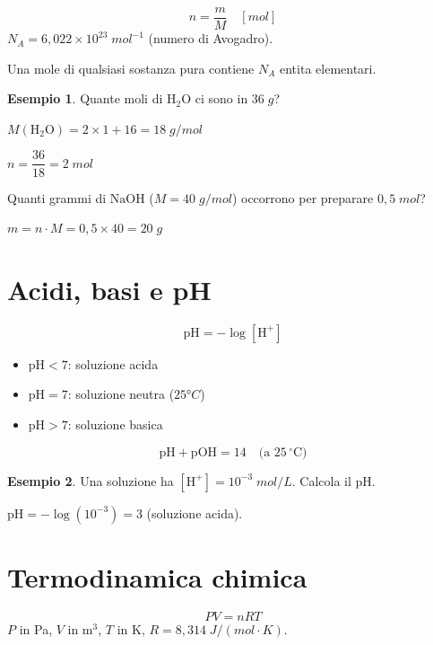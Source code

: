 \documentclass[12pt, a4paper, twoside, openright]{book}
\theoremstyle{definition}
\newtheorem{esempio}{Esempio}[section]
\begin{document}
\begin{defbox}
\[
n = \frac{m}{M} \quad [\si{mol}]
\]
$N_A = 6{,}022 \times 10^{23}\;\si{mol^{-1}}$ (numero di Avogadro).

Una mole di qualsiasi sostanza pura contiene $N_A$ entita elementari.
\end{defbox}

\begin{esempio}
Quante moli di $\mathrm{H_2O}$ ci sono in $36\;\si{g}$?

$M(\mathrm{H_2O}) = 2 \times 1 + 16 = 18\;\si{g/mol}$

$n = \dfrac{36}{18} = 2\;\si{mol}$
\end{esempio}

\begin{esercizio}
Quanti grammi di $\mathrm{NaOH}$ ($M = 40\;\si{g/mol}$) occorrono per preparare $0{,}5\;\si{mol}$?
\end{esercizio}
\begin{soluzione}
$m = n \cdot M = 0{,}5 \times 40 = 20\;\si{g}$
\end{soluzione}

\section{Acidi, basi e pH}

\begin{formulario}
\[
\mathrm{pH} = -\log[\mathrm{H^+}]
\]
\begin{itemize}
  \item $\mathrm{pH} < 7$: soluzione acida
  \item $\mathrm{pH} = 7$: soluzione neutra ($25°C$)
  \item $\mathrm{pH} > 7$: soluzione basica
\end{itemize}
\[
\mathrm{pH} + \mathrm{pOH} = 14 \quad \text{(a $25\,^{\circ}$C)}
\]
\end{formulario}

\begin{esempio}
Una soluzione ha $[\mathrm{H^+}] = 10^{-3}\;\si{mol/L}$. Calcola il pH.

$\mathrm{pH} = -\log(10^{-3}) = 3$ (soluzione acida).
\end{esempio}

\section{Termodinamica chimica}

\begin{defbox}
\[
PV = nRT
\]
$P$ in Pa, $V$ in m$^3$, $T$ in K, $R = 8{,}314\;\si{J/(mol \cdot K)}$.
\end{defbox}
\end{document}
